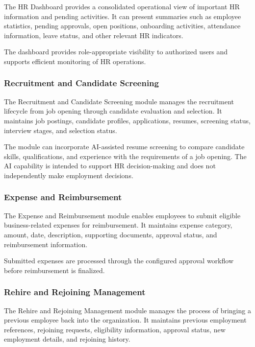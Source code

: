 \documentclass[12pt,a4paper]{article}
\begin{document}
The HR Dashboard provides a consolidated operational view of
important HR information and pending activities. It can present
summaries such as employee statistics, pending approvals, open
positions, onboarding activities, attendance information, leave
status, and other relevant HR indicators.

The dashboard provides role-appropriate visibility to authorized
users and supports efficient monitoring of HR operations.

\subsubsection{Recruitment and Candidate Screening}

The Recruitment and Candidate Screening module manages the
recruitment lifecycle from job opening through candidate evaluation
and selection. It maintains job postings, candidate profiles,
applications, resumes, screening status, interview stages, and
selection status.

The module can incorporate AI-assisted resume screening to compare
candidate skills, qualifications, and experience with the
requirements of a job opening. The AI capability is intended to
support HR decision-making and does not independently make
employment decisions.

\subsubsection{Expense and Reimbursement}

The Expense and Reimbursement module enables employees to submit
eligible business-related expenses for reimbursement. It maintains
expense category, amount, date, description, supporting documents,
approval status, and reimbursement information.

Submitted expenses are processed through the configured approval
workflow before reimbursement is finalized.

\subsubsection{Rehire and Rejoining Management}

The Rehire and Rejoining Management module manages the process of
bringing a previous employee back into the organization. It
maintains previous employment references, rejoining requests,
eligibility information, approval status, new employment details,
and rejoining history.
\end{document}
